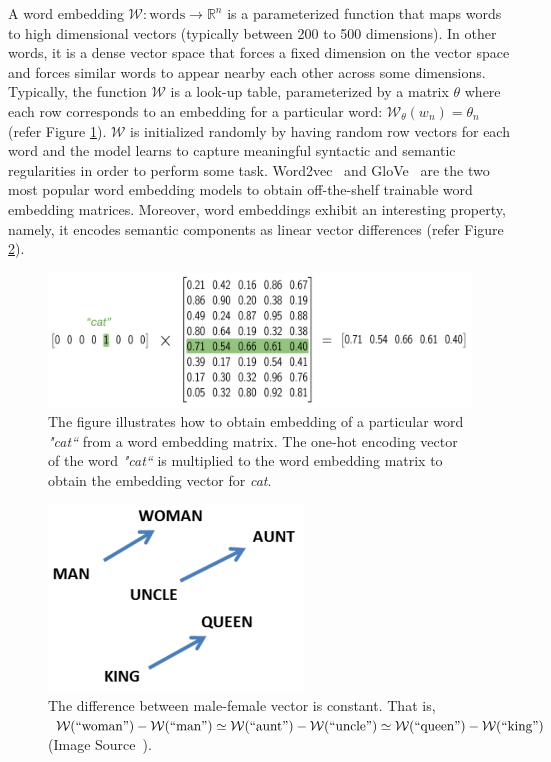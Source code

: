 A word embedding $\mathcal{W} : \text{words} \rightarrow \mathbb{R}^n$ is a parameterized function that maps words to high dimensional vectors (typically between 200 to 500 dimensions). In other words, it is a dense vector space that forces a fixed dimension on the vector space and forces similar words to appear nearby each other across some dimensions. Typically, the function $\mathcal{W}$ is a look-up table, parameterized by a matrix $\theta$ where each row corresponds to an embedding for a particular word: $\mathcal{W}_{\theta} (w_n) = \theta_n$ (refer Figure \ref{fig:word-embedding-matrix}). $\mathcal{W}$ is initialized randomly by having random row vectors for each word and the model learns to capture meaningful syntactic and semantic regularities in order to perform some task. Word2vec~\cite{mikolov2013distributed} and GloVe~\cite{pennington2014glove} are the two most popular word embedding models to obtain off-the-shelf trainable word embedding matrices. Moreover, word embeddings exhibit an interesting property, namely, it encodes semantic components as linear vector differences (refer Figure \ref{fig:linear-vector}).
 

\begin{figure}[!htb]
    \centering
    \includegraphics[scale=0.5]{Figures/word-embedding-matrix.png}
    \caption{The figure illustrates how to obtain embedding of a particular word \emph{"cat``} from a word embedding matrix. The one-hot encoding vector of the word \emph{"cat``} is multiplied to the word embedding matrix to obtain the embedding vector for \emph{cat}.}
    \label{fig:word-embedding-matrix}
\end{figure}


\begin{figure}[!htb]
    \centering
    \includegraphics[scale=0.5]{Figures/Mikolov-GenderVecs.png}
    \caption{The difference between male-female vector is constant. That is, $\mathcal{W}(``\text{woman}") - \mathcal{W}(``\text{man}") \simeq \mathcal{W}(``\text{aunt}") - \mathcal{W}(``\text{uncle}") \simeq \mathcal{W}(``\text{queen}") - \mathcal{W}(``\text{king}")$ (Image Source~\cite{mikolov2013distributed}).}
    \label{fig:linear-vector}
\end{figure}


